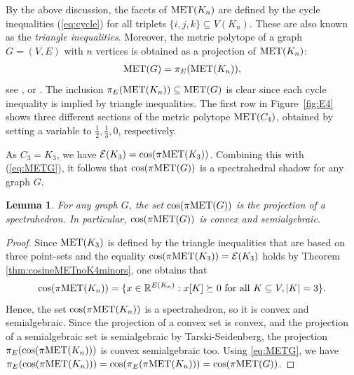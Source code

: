 \documentclass[a4paper, 11pt, twoside]{article}
\newcommand{\R}{\mathbb{R}}
\newcommand{\ME}{{\mathcal E}}
\newcommand{\MET}{\text{\rm MET}}
\theoremstyle{plain}
\newtheorem{lemma}[theorem]{Lemma}
\begin{document}
By the above discussion, 
the facets of $\MET(K_n)$ are defined by the cycle inequalities (\ref{eq:cycle}) for all triplets $\{i,j,k\}\subseteq V(K_n)$. These are also known as the {\em triangle inequalities}. Moreover, the metric polytope of a graph $G=(V,E)$ with $n$ vertices is obtained as a projection of $\MET(K_n)$: 
 \begin{align}\label{eq:METG}
 \MET(G)=\pi_E(\MET(K_n)),
 \end{align}
see \cite{Barahona-Mahjoub}, or  \cite[Chap. 27]{Deza-Laurent-1997}. The inclusion $\pi_E(\MET(K_n)) \subseteq \MET(G)$ is clear since each cycle inequality is implied by triangle inequalities.
The first row in Figure~\ref{fig:E4} shows three different sections of the metric polytope $\MET(C_4)$, obtained by setting a variable to $\tfrac{1}{2}, \tfrac{1}{3},0$, respectively.

As $C_3=K_3$, we have $\ME(K_3)=\cos (\pi\MET(K_3))$. Combining this with (\ref{eq:METG}), it follows that  $\cos(\pi\MET(G))$ is a spectrahedral shadow  for any graph $G$.

\begin{lemma}\label{lem:cosMET}
For any graph $G$, the set 
$\cos(\pi\MET(G))$ is the projection of a spectrahedron. In particular, $\cos(\pi\MET(G))$ is convex and semialgebraic.
\end{lemma}

\begin{proof}
Since   $\MET(K_3)$ is defined by the triangle inequalities that are based on three point-sets and the equality $\cos (\pi\MET(K_3)) =\ME(K_3)$ holds by Theorem \ref{thm:cosineMETnoK4minors}, one obtains that 
\[\cos(\pi\MET(K_n))=\{x\in \R^{E(K_n)}: x[K]\succeq 0 \text{ for all } K\subseteq  V, |K|=3\}.\]
 Hence, the set $ \cos(\pi\MET(K_n))$ is a spectrahedron, so it is convex and semialgebraic. Since the projection of a convex set is convex, and the projection of a semialgebraic set is semialgebraic by Tarski-Seidenberg,   the projection  $\pi_E(\cos(\pi\MET(K_n)))$ is convex semialgebraic too. Using \eqref{eq:METG}, we have $\pi_E(\cos(\pi\MET(K_n)))= \cos(\pi_E(\pi\MET(K_n)))= \cos(\pi\MET(G))$.\end{proof}
\end{document}
